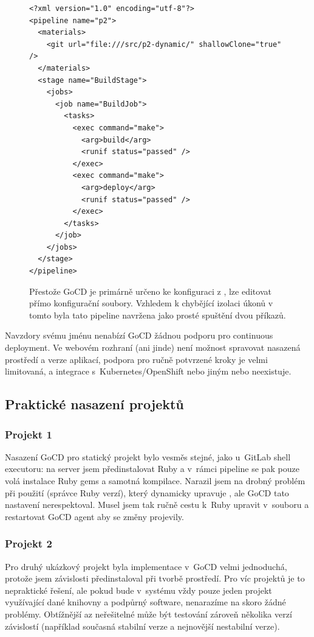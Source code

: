     \begin{figure}[H]
        \centering
        \begin{verbatim}
<?xml version="1.0" encoding="utf-8"?>
<pipeline name="p2">
  <materials>
    <git url="file:///src/p2-dynamic/" shallowClone="true" />
  </materials>
  <stage name="BuildStage">
    <jobs>
      <job name="BuildJob">
        <tasks>
          <exec command="make">
            <arg>build</arg>
            <runif status="passed" />
          </exec>
          <exec command="make">
            <arg>deploy</arg>
            <runif status="passed" />
          </exec>
        </tasks>
      </job>
    </jobs>
  </stage>
</pipeline>
        \end{verbatim}
        \caption{Přestože GoCD je primárně určeno ke konfiguraci z , lze editovat přímo konfigurační  soubory. Vzhledem k chybějící izolaci úkonů v tomto \CI byla tato pipeline navržena jako prosté spuštění dvou příkazů.}
    \end{figure}


        Navzdory svému jménu nenabízí GoCD žádnou podporu pro continuous deployment. Ve webovém rozhraní (ani jinde) není možnost spravovat nasazená prostředí a verze aplikací, podpora pro ručně potvrzené kroky je velmi limitovaná, a integrace s~Kubernetes/OpenShift nebo jiným  nebo neexistuje.

    \subsection{Praktické nasazení projektů}
        \subsubsection{Projekt 1}
            Nasazení GoCD pro statický projekt bylo vesměs stejné, jako u~GitLab shell executoru: na server jsem předinstalovat Ruby a v~rámci pipeline se pak pouze volá instalace Ruby gems a samotná kompilace. Narazil jsem na drobný problém při použití  (správce Ruby verzí), který dynamicky upravuje , ale GoCD tato nastavení nerespektoval. Musel jsem tak ručně cestu k~Ruby upravit v~souboru  a restartovat GoCD agent aby se změny projevily.

        \subsubsection{Projekt 2}
            Pro druhý ukázkový projekt byla implementace v~GoCD velmi jednoduchá, protože jsem závislosti předinstaloval při tvorbě prostředí. Pro víc projektů je to nepraktické řešení, ale pokud bude v~systému vždy pouze jeden projekt využívající dané knihovny a podpůrný software, nenarazíme na skoro žádné problémy. Obtížnější az neřešitelné může být testování zároveň několika verzí závislostí (například současná stabilní verze a nejnovější nestabilní verze).

